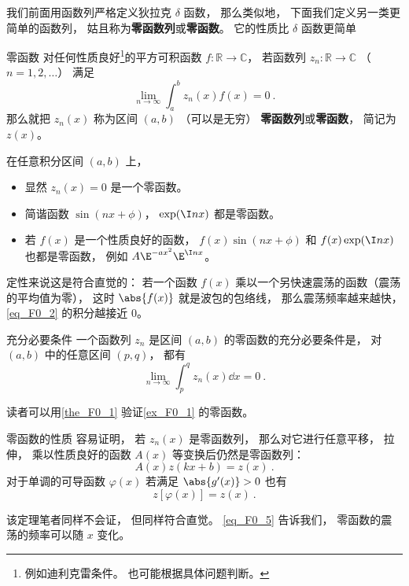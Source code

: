 
我们前面用函数列严格定义狄拉克 $\delta$ 函数， 那么类似地， 下面我们定义另一类更简单的函数列， 姑且称为\textbf{零函数列}或\textbf{零函数}。 它的性质比 $\delta$ 函数更简单
\begin{definition}{零函数}
对任何性质良好\footnote{例如迪利克雷条件。 也可能根据具体问题判断。}的平方可积函数 $f: \mathbb R \to \mathbb C$， 若函数列 $z_n: \mathbb R \to \mathbb C$ （$n = 1, 2, \dots$） 满足
\begin{equation}\label{eq_F0_2}
\lim_{n\to \infty}\int_{a}^{b} z_n(x) f(x) = 0~.
\end{equation}
那么就把 $z_n(x)$ 称为区间 $(a,b)$ （可以是无穷） \textbf{零函数列}或\textbf{零函数}， 简记为 $z(x)$。
\end{definition}

\begin{example}{}\label{ex_F0_1}
在任意积分区间 $(a,b)$ 上，
\begin{itemize}
\item 显然 $z_n(x) = 0$ 是一个零函数。
\item 简谐函数 $\sin(nx + \phi)$， $\exp(\I n x)$ 都是零函数。
\item 若 $f(x)$ 是一个性质良好的函数， $f(x)\sin(nx + \phi)$ 和 $f(x)\exp(\I n x)$ 也都是零函数， 例如 $A\E^{-ax^2}\E^{\I nx}$。
\end{itemize}

定性来说这是符合直觉的： 若一个函数 $f(x)$ 乘以一个另快速震荡的函数（震荡的平均值为零）， 这时 $\abs{f(x)}$ 就是波包的包络线， 那么震荡频率越来越快， \autoref{eq_F0_2} 的积分越接近 $0$。
\end{example}

\begin{theorem}{充分必要条件}\label{the_F0_1}
一个函数列 $z_n$ 是区间 $(a, b)$ 的零函数的充分必要条件是， 对 $(a, b)$ 中的任意区间 $(p, q)$， 都有
\begin{equation}
\lim_{n\to\infty}\int_p^q z_n(x) \dd{x} = 0~.
\end{equation}
\end{theorem}
读者可以用\autoref{the_F0_1} 验证\autoref{ex_F0_1} 的零函数。

\begin{theorem}{零函数的性质}
容易证明， 若 $z_n(x)$ 是零函数列， 那么对它进行任意平移， 拉伸， 乘以性质良好的函数 $A(x)$ 等变换后仍然是零函数列：
\begin{equation}
A(x) z(kx + b) = z(x)~.
\end{equation}
对于单调的可导函数 $\varphi(x)$ 若满足 $\abs{g'(x)} > 0$ 也有
\begin{equation}\label{eq_F0_5}
z[\varphi(x)] = z(x)~.
\end{equation}
\end{theorem}
该定理笔者同样不会证， 但同样符合直觉。 \autoref{eq_F0_5} 告诉我们， 零函数的震荡的频率可以随 $x$ 变化。

